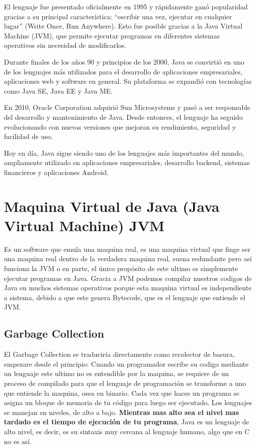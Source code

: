 El lenguaje fue presentado oficialmente en 1995 y rápidamente ganó popularidad gracias a su principal característica: “escribir una vez, ejecutar en cualquier lugar” (Write Once, Run Anywhere). Esto fue posible gracias a la Java Virtual Machine (JVM), que permite ejecutar programas en diferentes sistemas operativos sin necesidad de modificarlos.

Durante finales de los años 90 y principios de los 2000, Java se convirtió en uno de los lenguajes más utilizados para el desarrollo de aplicaciones empresariales, aplicaciones web y software en general. Su plataforma se expandió con tecnologías como Java SE, Java EE y Java ME.

En 2010, Oracle Corporation adquirió Sun Microsystems y pasó a ser responsable del desarrollo y mantenimiento de Java. Desde entonces, el lenguaje ha seguido evolucionando con nuevas versiones que mejoran su rendimiento, seguridad y facilidad de uso.

Hoy en día, Java sigue siendo uno de los lenguajes más importantes del mundo, ampliamente utilizado en aplicaciones empresariales, desarrollo backend, sistemas financieros y aplicaciones Android.

\section{Maquina Virtual de Java (Java Virtual Machine) JVM}
Es un software que emula una maquina real, es una maquina virtual que finge ser una maquina real dentro de la verdadera maquina real, suena redundante pero así funciona la JVM o en parte, el único propósito de este ultimo es simplemente ejecutar programas en Java. Gracia a JVM podemos compilar nuestros codigos de Java en muchos sistemas operativos porque esta maquina virtual es independiente a sistema, debido a que este genera Bytecode, que es el lenguaje que entiende el JVM.

\subsection{Garbage Collection}
El Garbage Collection se traduciría directamente como recolector de basura, empezare desde el principio: Cuando un programador escribe su codigo mediante un lenguaje este ultimo no es entendible por la maquina, se requiere de un proceso de compilado para que el lenguaje de programación se transforme a uno que entiende la maquina, osea en binario. Cada vez que haces un programa se asigna un bloque de memoria de tu código para luego ser ejecutado. Los lenguajes se manejan en niveles, de alto a bajo. \textbf{Mientras mas alto sea el nivel mas tardado es el tiempo de ejecución de tu programa}, Java es un lenguaje de alto nivel, es decir, es su sintaxis muy cercana al lenguaje humano, algo que en C no es así. \\

